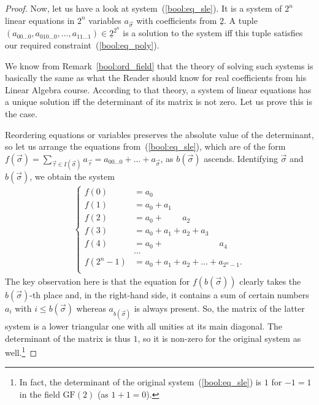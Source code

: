 \documentclass[12pt,notitlepage]{article}
\theoremstyle{plain}
\theoremstyle{definition}
\theoremstyle{plain}
\newcommand{\ul}[1]{\underline{#1}}
\newcommand{\1}{\mathbf{1}}
\newcommand{\0}{\mathbf{0}}
\begin{document}
\begin{proof}
Now, let us have a look at system~(\ref{bool:eq_sle}). It is a system of $2^n$ linear equations in $2^n$ variables $a_{\vec \sigma}$ with coefficients from $\ul{2}$. A tuple $(a_{00\ldots0}, a_{010\ldots0}, \ldots, a_{11\ldots1}) \in \ul{2}^{2^n}$ is a solution to the system iff this tuple satisfies our required constraint~(\ref{bool:eq_poly}).

We know from Remark~\ref{bool:ord_field} that the theory of solving such systems is basically the same as what the Reader should know for real coefficients from his Linear Algebra course. According to that theory, a system of linear equations has a unique solution iff the determinant of its matrix is not zero. Let us prove this is the case.

Reordering equations or variables preserves the absolute value of the determinant, so let us arrange the equations from~(\ref{bool:eq_sle}), which are of the form $f(\vec \sigma) = \sum_{\vec\tau \in I(\vec \sigma)} a_{\vec\tau} = a_{00\ldots0} + \ldots + a_{\vec \sigma}$, as $b(\vec \sigma)$ ascends. Identifying $\vec \sigma$ and $b(\vec \sigma)$, we obtain the system
$$
\begin{array}{l}
\begin{cases}
	 f(0) &= a_0\\
	 f(1) &= a_0 + a_1\\
	 f(2) &= a_0 +\phantom{a_1 +} a_2\\
	 f(3) &= a_0 + a_1 + a_2 + a_3\\
	 f(4) &= a_0 +\phantom{a_1 + a_2 + a_3 +} a_4\\
	 &\ldots\\
	 f(2^{n} - 1) &= a_0 + a_1 + a_2 + \ldots + a_{2^{n} - 1}.\\
\end{cases}
\end{array}
$$
The key observation here is that the equation for $f(b(\vec \sigma))$ clearly takes the $b(\vec \sigma)$-th place and, in the right-hand side, it contains a sum of certain numbers $a_i$ with $i \leq b(\vec \sigma)$ whereas $a_{b(\vec \sigma)}$ is always present. So, the matrix of the latter system is a lower triangular one with all unities at its main diagonal. The determinant of the matrix is thus $1$, so it is non-zero for the original system as well.\footnote{In fact, the determinant of the original system~(\ref{bool:eq_sle}) is $1$ for $-1 = 1$ in the field $\mathrm{GF}(2)$ (as $1 + 1 = 0$).}
\end{proof}
\end{document}

